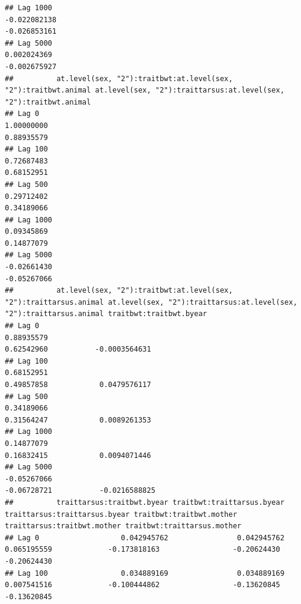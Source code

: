 \documentclass[
  12pt,
]{book}
\begin{document}
\begin{verbatim}
## Lag 1000                                                      -0.022082138                                                         -0.026853161
## Lag 5000                                                       0.002024369                                                         -0.002675927
##          at.level(sex, "2"):traitbwt:at.level(sex, "2"):traitbwt.animal at.level(sex, "2"):traittarsus:at.level(sex, "2"):traitbwt.animal
## Lag 0                                                        1.00000000                                                        0.88935579
## Lag 100                                                      0.72687483                                                        0.68152951
## Lag 500                                                      0.29712402                                                        0.34189066
## Lag 1000                                                     0.09345869                                                        0.14877079
## Lag 5000                                                    -0.02661430                                                       -0.05267066
##          at.level(sex, "2"):traitbwt:at.level(sex, "2"):traittarsus.animal at.level(sex, "2"):traittarsus:at.level(sex, "2"):traittarsus.animal traitbwt:traitbwt.byear
## Lag 0                                                           0.88935579                                                           0.62542960           -0.0003564631
## Lag 100                                                         0.68152951                                                           0.49857858            0.0479576117
## Lag 500                                                         0.34189066                                                           0.31564247            0.0089261353
## Lag 1000                                                        0.14877079                                                           0.16832415            0.0094071446
## Lag 5000                                                       -0.05267066                                                          -0.06728721           -0.0216588825
##          traittarsus:traitbwt.byear traitbwt:traittarsus.byear traittarsus:traittarsus.byear traitbwt:traitbwt.mother traittarsus:traitbwt.mother traitbwt:traittarsus.mother
## Lag 0                   0.042945762                0.042945762                   0.065195559             -0.173818163                 -0.20624430                 -0.20624430
## Lag 100                 0.034889169                0.034889169                   0.007541516             -0.100444862                 -0.13620845                 -0.13620845

\end{verbatim}
\end{document}
